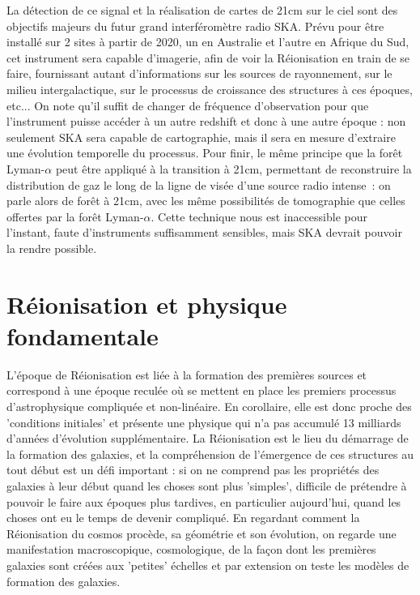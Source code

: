 La détection de ce signal et la réalisation de cartes de 21cm sur le ciel sont des objectifs majeurs du futur grand interféromètre radio SKA. Prévu pour être installé sur 2 sites à partir de 2020, un en Australie et l'autre en Afrique du Sud, cet instrument sera capable d'imagerie, afin de voir la Réionisation en train de se faire, fournissant autant d'informations sur les sources de rayonnement, sur le milieu intergalactique, sur le processus de croissance des structures à ces époques, etc... On note qu'il suffit de changer de fréquence d'observation pour que l'instrument puisse accéder à un autre redshift et donc à une autre époque : non seulement SKA sera capable de cartographie, mais il sera en mesure d'extraire une évolution temporelle du processus. Pour finir, le même principe que la forêt Lyman-$\alpha$ peut être appliqué à la transition à 21cm, permettant de reconstruire la distribution de gaz le long de la ligne de visée d'une source radio intense~: on parle alors de forêt à 21cm, avec les même possibilités de tomographie que celles offertes par la forêt Lyman-$\alpha$. Cette technique nous est inaccessible pour l'instant, faute d'instruments suffisamment sensibles, mais SKA devrait pouvoir la rendre possible. 

\section{Réionisation et physique fondamentale}
L'époque de Réionisation est liée à la formation des premières sources et correspond à une époque reculée où se mettent en place les premiers processus d'astrophysique compliquée et non-linéaire. En corollaire, elle est donc proche des 'conditions initiales' et présente une physique qui n'a pas accumulé 13 milliards d'années d'évolution supplémentaire. La Réionisation est le lieu du démarrage de la formation des galaxies, et la compréhension de l'émergence de ces structures au tout début est un défi important : si on ne comprend pas les propriétés des galaxies à leur début quand les choses sont plus 'simples', difficile de prétendre à pouvoir le faire aux époques plus tardives, en particulier aujourd'hui, quand les choses ont eu le temps de devenir compliqué. En regardant comment la Réionisation du cosmos procède, sa géométrie et son évolution, on regarde une manifestation macroscopique, cosmologique, de la façon dont les premières galaxies sont créées aux 'petites' échelles et par extension on teste les modèles de formation des galaxies.


